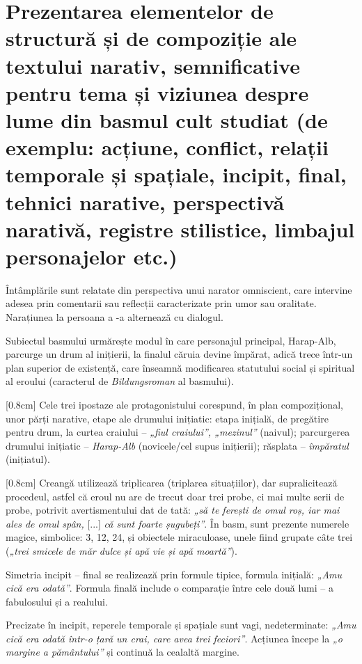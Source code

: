 \section{Prezentarea elementelor de structură și de compoziție ale textului narativ, semnificative pentru tema și viziunea despre lume din basmul cult studiat {\footnotesize\normalfont (de exemplu: acțiune, conflict, relații temporale și spațiale, incipit, final, tehnici narative, perspectivă narativă, registre stilistice, limbajul personajelor etc.)}}
Întâmplările sunt relatate din perspectiva unui narator omniscient, care intervine adesea prin comentarii sau reflecții caracterizate prin umor sau oralitate. Narațiunea la persoana a -a alternează cu dialogul.

Subiectul basmului urmărește modul în care personajul principal, Harap-Alb, parcurge un drum al inițierii, la finalul căruia devine împărat, adică trece într-un plan superior de existență, care înseamnă modificarea statutului social și spiritual al eroului (caracterul de \textit{Bildungsroman} al basmului).

[0.8cm]
Cele trei ipostaze ale protagonistului corespund, în plan compozițional, unor părți narative, etape ale drumului inițiatic: etapa inițială, de pregătire pentru drum, la curtea craiului -- \textit{„fiul craiului”, „mezinul”} (naivul); parcurgerea drumului inițiatic -- \textit{Harap-Alb} (novicele/cel supus inițierii); răsplata -- \textit{împăratul} (inițiatul).

[0.8cm]
Creangă utilizează triplicarea (triplarea situațiilor), dar supralicitează procedeul, astfel că eroul nu are de trecut doar trei probe, ci mai multe serii de probe, potrivit avertismentului dat de tată: \textit{„să te ferești de omul roș, iar mai ales de omul spân,} [...] \textit{că sunt foarte șugubeți”}. În basm, sunt prezente numerele magice, simbolice: 3, 12, 24, și obiectele miraculoase, unele fiind grupate câte trei (\textit{„trei smicele de măr dulce și apă vie și apă moartă”}).

Simetria incipit -- final se realizează prin formule tipice, formula inițială: \textit{„Amu cică era odată”}. Formula finală include o comparație între cele două lumi -- a fabulosului și a realului.

Precizate în incipit, reperele temporale și spațiale sunt vagi, nedeterminate: \textit{„Amu cică era odată într-o țară un crai, care avea trei feciori”}. Acțiunea începe la \textit{„o margine a pământului”} și continuă la cealaltă margine.

